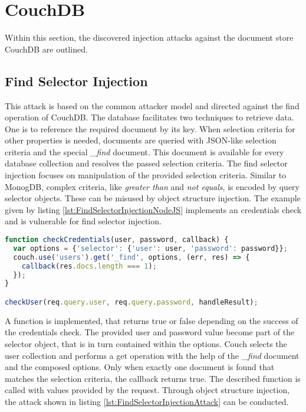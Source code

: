 \section{CouchDB}
Within this section, the discovered injection attacks against the document store CouchDB are outlined.

\subsection{Find Selector Injection}
This attack is based on the common attacker model and directed against the find operation of CouchDB. The database facilitates two techniques to retrieve data. One is to reference the required document by its key. When selection criteria for other properties is needed, documents are queried with JSON-like selection criteria and the special \emph{\_find} document. This document is available for every database collection and resolves the passed selection criteria. The find selector injection focuses on manipulation of the provided selection criteria. Similar to MonogDB, complex criteria, like \emph{greater than} and \emph{not equals}, is encoded by query selector objects. These can be misused by object structure injection. The example given by listing \ref{lst:FindSelectorInjectionNodeJS} implements an credentials check and is vulnerable for find selector injection. \\

\begin{lstlisting}[caption={Vulnerable NodeJS example for find selector injection on CouchDB}, label={lst:FindSelectorInjectionNodeJS}, language=JavaScript]
function checkCredentials(user, password, callback) {
  var options = {'selector': {'user': user, 'password': password}};
  couch.use('users').get('_find', options, (err, res) => {
    callback(res.docs.length === 1);
  });
}

checkUser(req.query.user, req.query.password, handleResult);
\end{lstlisting}

A function is implemented, that returns true or false depending on the success of the credentials check. The provided user and password value become part of the selector object, that is in turn contained within the options. Couch selects the user collection and performs a get operation with the help of the \emph{\_find} document and the composed options. Only when exactly one document is found that matches the selection criteria, the callback returns true. The described function is called with values provided by the request. Through object structure injection, the attack shown in listing \ref{lst:FindSelectorInjectionAttack} can be conducted. \\

